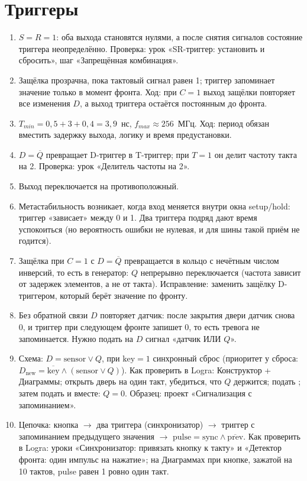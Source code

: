 \section*{Триггеры}
\begin{enumerate}
  \item {} $S=R=1$: оба выхода становятся нулями, а после снятия сигналов состояние триггера неопределённо. Проверка: урок «SR-триггер: установить и сбросить», шаг «Запрещённая комбинация».
  \item {} Защёлка прозрачна, пока тактовый сигнал равен 1; триггер запоминает значение только в момент фронта. Ход: при $C=1$ выход защёлки повторяет все изменения $D$, а выход триггера остаётся постоянным до фронта.
  \item {} $T_{min}=0{,}5+3+0{,}4=3{,}9$~нс, $f_{max}\approx 256$~МГц. Ход: период обязан вместить задержку выхода, логику и время предустановки.
  \item {} $D=\overline{Q}$ превращает D-триггер в T-триггер; при $T=1$ он делит частоту такта на 2. Проверка: урок «Делитель частоты на 2».
  \item {} Выход переключается на противоположный.
  \item {} Метастабильность возникает, когда вход меняется внутри окна setup/hold: триггер «зависает» между 0 и 1. Два триггера подряд дают время успокоиться (но вероятность ошибки не нулевая, и для шины такой приём не годится).
  \item {} Защёлка при $C=1$ с $D=\overline{Q}$ превращается в кольцо с нечётным числом инверсий, то есть в генератор: $Q$ непрерывно переключается (частота зависит от задержек элементов, а не от такта). Исправление: заменить защёлку D-триггером, который берёт значение по фронту.
  \item {} Без обратной связи $D$ повторяет датчик: после закрытия двери датчик снова 0, и триггер при следующем фронте запишет 0, то есть тревога не запоминается. Нужно подать на $D$ сигнал «датчик ИЛИ $Q$».
  \item {} Схема: $D=\text{sensor}\lor Q$, при $\text{key}=1$ синхронный сброс (приоритет у сброса: $D_{\text{new}}=\overline{\text{key}}\land(\text{sensor}\lor Q)$). Как проверить в Logra: Конструктор + Диаграммы; открыть дверь на один такт, убедиться, что $Q$ держится; подать ; затем подать  и  вместе: $Q=0$. Образец: проект «Сигнализация с запоминанием».
  \item {} Цепочка: кнопка $\to$ два триггера (синхронизатор) $\to$ триггер с запоминанием предыдущего значения $\to$ $\text{pulse}=\text{sync}\land\overline{\text{prev}}$. Как проверить в Logra: уроки «Синхронизатор: привязать кнопку к такту» и «Детектор фронта: один импульс на нажатие»; на Диаграммах при кнопке, зажатой на 10 тактов, pulse равен 1 ровно один такт.
\end{enumerate}

